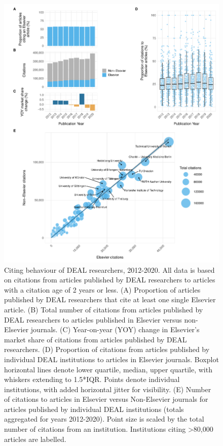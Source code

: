\documentclass[
]{article}
\begin{document}
\begin{figure}

{\centering \includegraphics[width=0.833\linewidth]{analysis_files/figure-latex/references-publisher-year-1} 

}

\caption{Citing behaviour of DEAL researchers, 2012-2020. All data is based on citations from articles published by DEAL researchers to articles with a citation age of 2 years or less. (A) Proportion of articles published by DEAL researchers that cite at least one single Elsevier article. (B) Total number of citations from articles published by DEAL researchers to articles published in Elsevier versus non-Elsevier journals. (C) Year-on-year (YOY) change in Elsevier's market share of citations from articles published by DEAL researchers. (D) Proportion of citations from articles published by individual DEAL institutions to articles in Elsevier journals. Boxplot horizontal lines denote lower quartile, median, upper quartile, with whiskers extending to 1.5*IQR. Points denote individual institutions, with added horizontal jitter for visibility. (E) Number of citations to articles in Elsevier versus Non-Elsevier journals for articles published by individual DEAL institutions (totals aggregated for years 2012-2020). Point size is scaled by the total number of citations from an institution. Institutions citing >80,000 articles are labelled.}\label{fig:references-publisher-year}
\end{figure}
\end{document}
